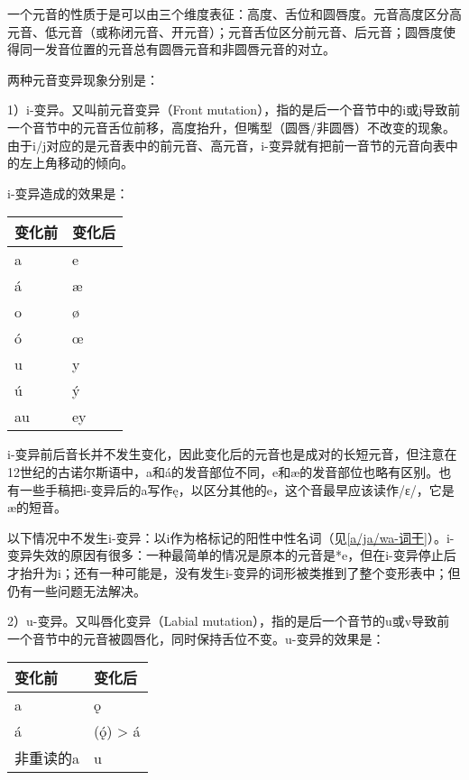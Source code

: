 一个元音的性质于是可以由三个维度表征：高度、舌位和圆唇度。元音高度区分高元音、低元音（或称闭元音、开元音）；元音舌位区分前元音、后元音；圆唇度使得同一发音位置的元音总有圆唇元音和非圆唇元音的对立。

两种元音变异现象分别是：

1）i-变异。又叫前元音变异（Front
mutation），指的是后一个音节中的i或j导致前一个音节中的元音舌位前移，高度抬升，但嘴型（圆唇/非圆唇）不改变的现象。由于i/j对应的是元音表中的前元音、高元音，i-变异就有把前一音节的元音向表中的左上角移动的倾向。

i-变异造成的效果是：

\begin{longtable}{ll}
  \toprule
  变化前 & 变化后 \\
  \midrule
  \endhead
  \bottomrule
  \endfoot
  a      & e      \\
  á      & æ      \\
  o      & ø      \\
  ó      & œ      \\
  u      & y      \\
  ú      & ý      \\
  au     & ey     \\
\end{longtable}

i-变异前后音长并不发生变化，因此变化后的元音也是成对的长短元音，但注意在12世纪的古诺尔斯语中，a和á的发音部位不同，e和æ的发音部位也略有区别。也有一些手稿把i-变异后的a写作ę，以区分其他的e，这个音最早应该读作/ɛ/，它是æ的短音。

以下情况中不发生i-变异：以i作为格标记的阳性中性名词（见\ref{a/ja/wa-词干}）。i-变异失效的原因有很多：一种最简单的情况是原本的元音是*e，但在i-变异停止后才抬升为i；还有一种可能是，没有发生i-变异的词形被类推到了整个变形表中；但仍有一些问题无法解决。

2）u-变异。又叫唇化变异（Labial
mutation），指的是后一个音节的u或v导致前一个音节中的元音被圆唇化，同时保持舌位不变。u-变异的效果是：

\begin{longtable}{ll}
  \toprule
  变化前    & 变化后               \\
  \midrule
  \endhead
  \bottomrule
  \endfoot
  a         & ǫ                    \\
  á         & (ǫ́) \textgreater{} á \\
  非重读的a & u                    \\
\end{longtable}

